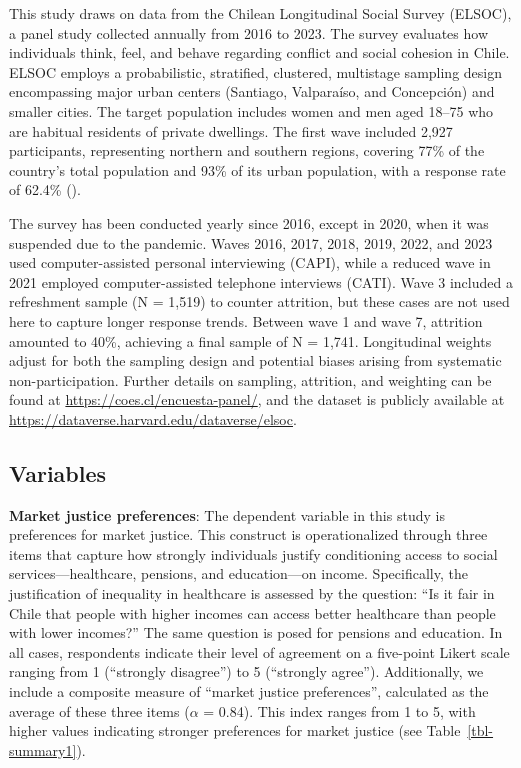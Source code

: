 \documentclass[
  12pt,
]{article}
\begin{document}
This study draws on data from the Chilean Longitudinal Social Survey
(ELSOC), a panel study collected annually from 2016 to 2023. The survey
evaluates how individuals think, feel, and behave regarding conflict and
social cohesion in Chile. ELSOC employs a probabilistic, stratified,
clustered, multistage sampling design encompassing major urban centers
(Santiago, Valparaíso, and Concepción) and smaller cities. The target
population includes women and men aged 18--75 who are habitual residents
of private dwellings. The first wave included 2,927 participants,
representing northern and southern regions, covering 77\% of the
country's total population and 93\% of its urban population, with a
response rate of 62.4\% ().

The survey has been conducted yearly since 2016, except in 2020, when it
was suspended due to the pandemic. Waves 2016, 2017, 2018, 2019, 2022,
and 2023 used computer-assisted personal interviewing (CAPI), while a
reduced wave in 2021 employed computer-assisted telephone interviews
(CATI). Wave 3 included a refreshment sample (N = 1,519) to counter
attrition, but these cases are not used here to capture longer response
trends. Between wave 1 and wave 7, attrition amounted to 40\%, achieving
a final sample of N = 1,741. Longitudinal weights adjust for both the
sampling design and potential biases arising from systematic
non-participation. Further details on sampling, attrition, and weighting
can be found at \url{https://coes.cl/encuesta-panel/}, and the dataset
is publicly available at
\url{https://dataverse.harvard.edu/dataverse/elsoc}.

\subsection{Variables}\label{variables}

\textbf{Market justice preferences}: The dependent variable in this
study is preferences for market justice. This construct is
operationalized through three items that capture how strongly
individuals justify conditioning access to social services---healthcare,
pensions, and education---on income. Specifically, the justification of
inequality in healthcare is assessed by the question: ``Is it fair in
Chile that people with higher incomes can access better healthcare than
people with lower incomes?'' The same question is posed for pensions and
education. In all cases, respondents indicate their level of agreement
on a five-point Likert scale ranging from 1 (``strongly disagree'') to 5
(``strongly agree''). Additionally, we include a composite measure of
``market justice preferences'', calculated as the average of these three
items (\(\alpha\) = 0.84). This index ranges from 1 to 5, with higher
values indicating stronger preferences for market justice (see
Table~\ref{tbl-summary1}).
\end{document}
